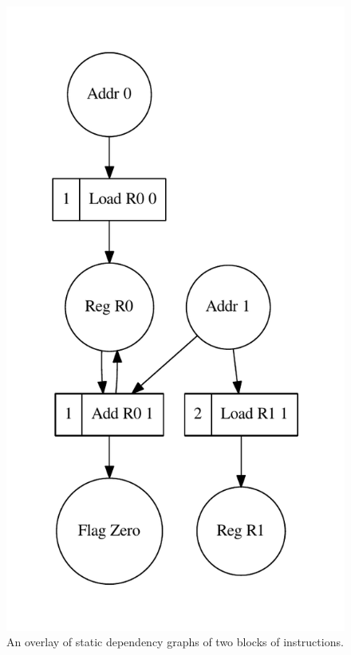 \begin{figure}
\vspace{-4mm}
\centerline{\includegraphics[scale=0.7]{img/oracle2.pdf}}
\vspace{-4mm}
\caption{An overlay of static dependency graphs of two blocks of instructions.\label{fig-example-graph}}
\vspace{-4mm}
\end{figure}
